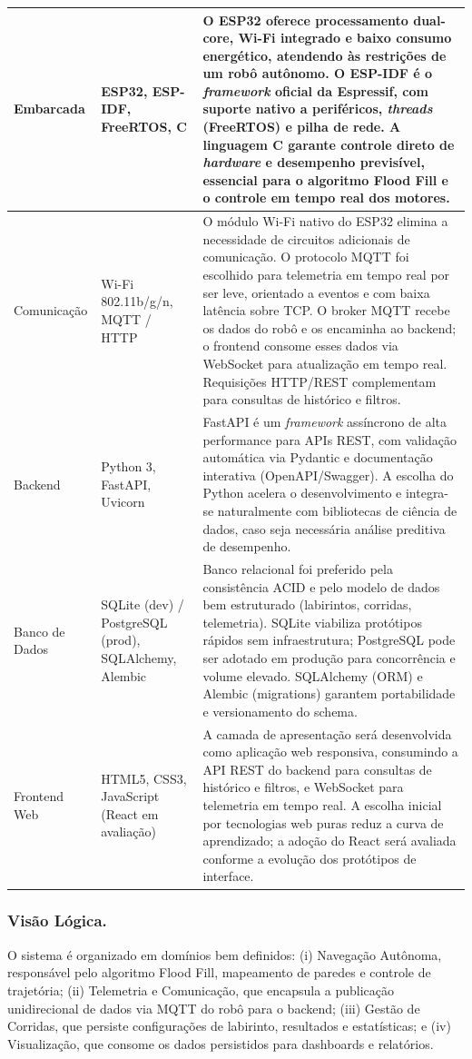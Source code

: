 \begin{center}
\begin{longtable}{p{2.8cm}p{3.5cm}p{8.5cm}}
    Embarcada & ESP32, ESP-IDF, FreeRTOS, C & O ESP32 oferece processamento dual-core, Wi-Fi integrado e baixo consumo energético, atendendo às restrições de um robô autônomo. O ESP-IDF é o \textit{framework} oficial da Espressif, com suporte nativo a periféricos, \textit{threads} (FreeRTOS) e pilha de rede. A linguagem C garante controle direto de \textit{hardware} e desempenho previsível, essencial para o algoritmo Flood Fill e o controle em tempo real dos motores. \\
    \midrule
    Comunicação & Wi-Fi 802.11b/g/n, MQTT / HTTP & O módulo Wi-Fi nativo do ESP32 elimina a necessidade de circuitos adicionais de comunicação. O protocolo MQTT foi escolhido para telemetria em tempo real por ser leve, orientado a eventos e com baixa latência sobre TCP. O broker MQTT recebe os dados do robô e os encaminha ao backend; o frontend consome esses dados via WebSocket para atualização em tempo real. Requisições HTTP/REST complementam para consultas de histórico e filtros. \\
    \midrule
    Backend & Python 3, FastAPI, Uvicorn & FastAPI é um \textit{framework} assíncrono de alta performance para APIs REST, com validação automática via Pydantic e documentação interativa (OpenAPI/Swagger). A escolha do Python acelera o desenvolvimento e integra-se naturalmente com bibliotecas de ciência de dados, caso seja necessária análise preditiva de desempenho. \\
    \midrule
    Banco de Dados & SQLite (dev) / PostgreSQL (prod), SQLAlchemy, Alembic & Banco relacional foi preferido pela consistência ACID e pelo modelo de dados bem estruturado (labirintos, corridas, telemetria). SQLite viabiliza protótipos rápidos sem infraestrutura; PostgreSQL pode ser adotado em produção para concorrência e volume elevado. SQLAlchemy (ORM) e Alembic (migrations) garantem portabilidade e versionamento do schema. \\
    \midrule
    Frontend Web & HTML5, CSS3, JavaScript (React em avaliação) & A camada de apresentação será desenvolvida como aplicação web responsiva, consumindo a API REST do backend para consultas de histórico e filtros, e WebSocket para telemetria em tempo real. A escolha inicial por tecnologias web puras reduz a curva de aprendizado; a adoção do React será avaliada conforme a evolução dos protótipos de interface. \\
\end{longtable}
\end{center}
\subsubsection{Visão Lógica.} O sistema é organizado em domínios bem definidos: (i) Navegação Autônoma, responsável pelo algoritmo Flood Fill, mapeamento de paredes e controle de trajetória; (ii) Telemetria e Comunicação, que encapsula a publicação unidirecional de dados via MQTT do robô para o backend; (iii) Gestão de Corridas, que persiste configurações de labirinto, resultados e estatísticas; e (iv) Visualização, que consome os dados persistidos para dashboards e relatórios.

